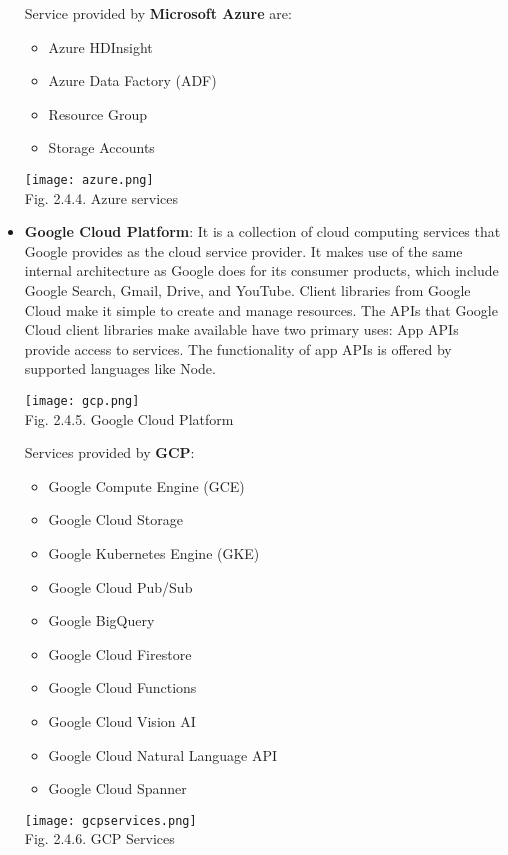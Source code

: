 \documentclass[12pt,a4paper]{article}
\begin{document}
\begin{itemize}
Service provided by \textbf{Microsoft Azure} are:
\begin{itemize}
\item Azure HDInsight
\item Azure Data Factory (ADF)
\item Resource Group
\item Storage Accounts
\end{itemize}
\begin{center}
\texttt{[image: azure.png]}\\
Fig. 2.4.4. Azure services
\end{center}
\item \textbf{Google Cloud Platform}: It is a collection of cloud computing services that Google provides as the cloud service provider. It makes use of the same internal architecture as Google does for its consumer products, which include Google Search, Gmail, Drive, and YouTube. Client libraries from Google Cloud make it simple to create and manage resources. The APIs that Google Cloud client libraries make available have two primary uses: App APIs provide access to services. The functionality of app APIs is offered by supported languages like Node.\\
\begin{center}
\texttt{[image: gcp.png]}\\
Fig. 2.4.5. Google Cloud Platform
\end{center}
Services provided by \textbf{GCP}:
\begin{itemize}
\item Google Compute Engine (GCE)
\item Google Cloud Storage
\item Google Kubernetes Engine (GKE)
\item Google Cloud Pub/Sub
\item Google BigQuery
\item Google Cloud Firestore
\item Google Cloud Functions
\item Google Cloud Vision AI
\item Google Cloud Natural Language API
\item Google Cloud Spanner
\end{itemize}
\begin{center}
\texttt{[image: gcpservices.png]}\\
Fig. 2.4.6. GCP Services
\end{center}
\end{itemize}


 
 
\end{document}

